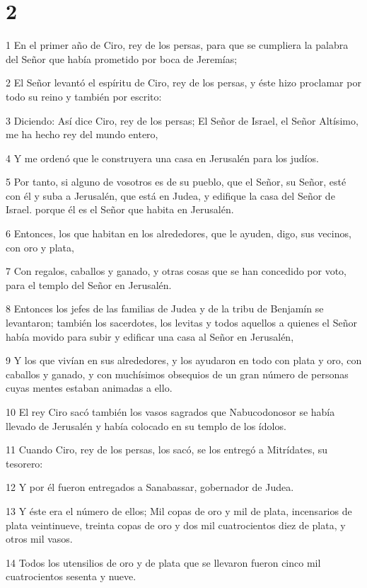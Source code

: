 \chapter{2}

\par 1 En el primer año de Ciro, rey de los persas, para que se cumpliera la palabra del Señor que había prometido por boca de Jeremías;
\par 2 El Señor levantó el espíritu de Ciro, rey de los persas, y éste hizo proclamar por todo su reino y también por escrito:
\par 3 Diciendo: Así dice Ciro, rey de los persas; El Señor de Israel, el Señor Altísimo, me ha hecho rey del mundo entero,
\par 4 Y me ordenó que le construyera una casa en Jerusalén para los judíos.
\par 5 Por tanto, si alguno de vosotros es de su pueblo, que el Señor, su Señor, esté con él y suba a Jerusalén, que está en Judea, y edifique la casa del Señor de Israel. porque él es el Señor que habita en Jerusalén.
\par 6 Entonces, los que habitan en los alrededores, que le ayuden, digo, sus vecinos, con oro y plata,
\par 7 Con regalos, caballos y ganado, y otras cosas que se han concedido por voto, para el templo del Señor en Jerusalén.
\par 8 Entonces los jefes de las familias de Judea y de la tribu de Benjamín se levantaron; también los sacerdotes, los levitas y todos aquellos a quienes el Señor había movido para subir y edificar una casa al Señor en Jerusalén,
\par 9 Y los que vivían en sus alrededores, y los ayudaron en todo con plata y oro, con caballos y ganado, y con muchísimos obsequios de un gran número de personas cuyas mentes estaban animadas a ello.
\par 10 El rey Ciro sacó también los vasos sagrados que Nabucodonosor se había llevado de Jerusalén y había colocado en su templo de los ídolos.
\par 11 Cuando Ciro, rey de los persas, los sacó, se los entregó a Mitrídates, su tesorero:
\par 12 Y por él fueron entregados a Sanabassar, gobernador de Judea.
\par 13 Y éste era el número de ellos; Mil copas de oro y mil de plata, incensarios de plata veintinueve, treinta copas de oro y dos mil cuatrocientos diez de plata, y otros mil vasos.
\par 14 Todos los utensilios de oro y de plata que se llevaron fueron cinco mil cuatrocientos sesenta y nueve.
